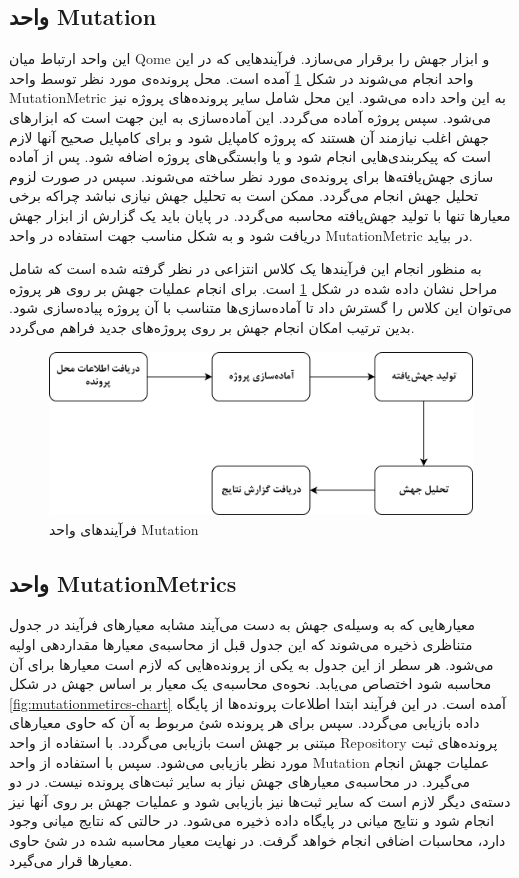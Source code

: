 \subsection{واحد Mutation}
این واحد ارتباط میان Qome و ابزار جهش را برقرار می‌سازد. فرآیندهایی که در این واحد انجام می‌شوند در شکل \ref{fig:mutation-chart} آمده است. محل پرونده‌ی مورد نظر توسط واحد MutationMetric به این واحد داده می‌شود. این محل شامل سایر پرونده‌های پروژه نیز می‌شود. سپس پروژه آماده می‌گردد. این آماده‌سازی به این جهت است که ابزارهای جهش اغلب نیازمند آن هستند که پروژه کامپایل شود و برای  کامپایل صحیح آنها لازم است که پیکربندی‌هایی انجام شود و یا وابستگی‌های پروژه اضافه شود. پس از آماده سازی جهش‌یافته‌ها برای پرونده‌ی مورد نظر ساخته می‌شوند. سپس در صورت لزوم تحلیل جهش انجام می‌گردد. ممکن است به تحلیل جهش نیازی نباشد چراکه برخی معیارها تنها با تولید جهش‌یافته محاسبه می‌گردد. در پایان باید یک گزارش از ابزار جهش دریافت شود و به شکل مناسب جهت استفاده در واحد MutationMetric در بیاید. 

به منظور انجام این فرآیندها یک کلاس انتزاعی در نظر گرفته شده است که شامل مراحل نشان داده شده در شکل \ref{fig:mutation-chart}  است. برای انجام عملیات جهش بر روی هر پروژه می‌توان این کلاس را گسترش داد تا آماده‌سازی‌ها متناسب با آن پروژه پیاده‌سازی شود. بدین ترتیب امکان انجام جهش بر روی پروژه‌های جدید فراهم می‌گردد.

\begin{figure}[H]
	\centering
	\includegraphics[width=.8\textwidth]{img/method/mutation-chart.png}
	\caption{ فرآیند‌های واحد Mutation}
	\label{fig:mutation-chart}
\end{figure}

\subsection{واحد MutationMetrics}

معیارهایی که به وسیله‌ی جهش به دست می‌آیند مشابه معیارهای فرآیند در جدول متناظری ذخیره می‌شوند که  این جدول قبل از محاسبه‌ی معیارها مقداردهی اولیه می‌شود. هر سطر از این جدول به یکی از پرونده‌هایی که لازم است معیارها برای آن محاسبه شود اختصاص می‌یابد.  نحوه‌ی محاسبه‌ی یک معیار بر اساس جهش در شکل \ref{fig:mutationmetircs-chart} آمده است. در این فرآیند ابتدا اطلاعات پرونده‌ها از پایگاه داده بازیابی می‌گردد. سپس برای هر پرونده شئ مربوط به آن که حاوی معیارهای  مبتنی  بر جهش است بازیابی می‌گردد. با استفاده از واحد Repository‌ پرونده‌های ثبت مورد نظر بازیابی می‌شود. سپس با استفاده از واحد Mutation عملیات جهش انجام می‌گیرد. در محاسبه‌ی معیارهای جهش نیاز به سایر ثبت‌های پرونده نیست. در دو دسته‌ی دیگر لازم است که سایر ثبت‌ها نیز بازیابی شود و عملیات جهش بر روی آنها نیز انجام شود و نتایج میانی در پایگاه داده ذخیره می‌شود.  در حالتی که نتایج میانی وجود دارد، محاسبات اضافی انجام خواهد گرفت.  در نهایت معیار محاسبه شده در شئ حاوی معیارها قرار می‌گیرد. 

